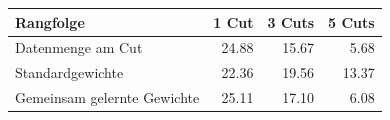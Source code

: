 \begin{tabular}{@{}lrrr@{}}
\toprule
Rangfolge & 1 Cut & 3 Cuts & 5 Cuts \\
\midrule
Datenmenge am Cut & 24.88 & 15.67 & 5.68 \\
Standardgewichte & 22.36 & 19.56 & 13.37 \\
Gemeinsam gelernte Gewichte & 25.11 & 17.10 & 6.08 \\
\bottomrule
\end{tabular}
